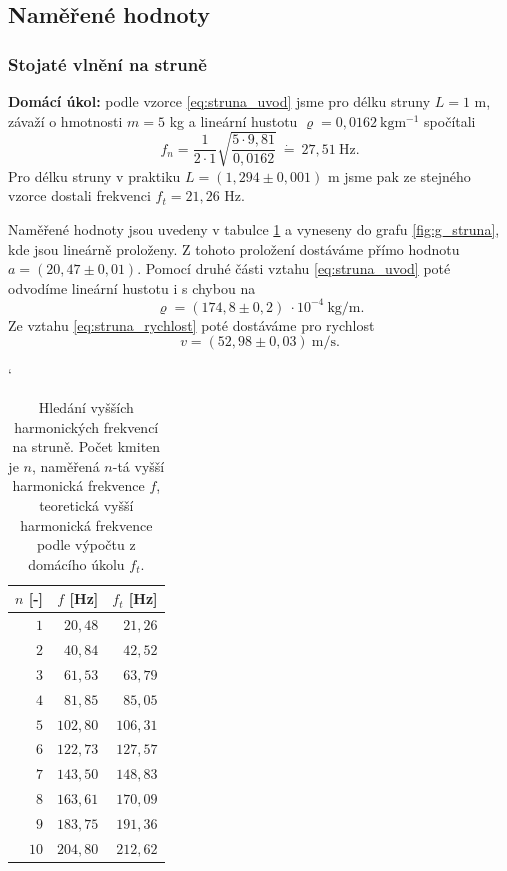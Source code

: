 \documentclass[english]{article}
\newcommand{\unit}[1]{\mathrm{#1}}
\begin{document}
\subsection{Naměřené hodnoty}
	\subsubsection{Stojaté vlnění na struně}
		\textbf{Domácí úkol:} podle vzorce \ref{eq:struna_uvod} jsme pro délku struny $L=1$ m, závaží o hmotnosti $m=5$ kg a lineární hustotu $\varrho=0,0162\ \unit{kgm^{-1}}$ spočítali
			\begin{equation}
			f_n = \frac{1}{2\cdot 1} \sqrt{\frac{5\cdot 9,81}{0,0162}}\ \dot{=}\ 27,51\ \unit{Hz}.
			\label{eq:struna_vypocet}
			\end{equation}		
		Pro délku struny v praktiku $L = (1,294 \pm 0,001)$ m jsme pak ze stejného vzorce dostali frekvenci $f_t = 21,26$ Hz.	
		 
		Naměřené hodnoty jsou uvedeny v tabulce \ref{tab:struna} a vyneseny do grafu \ref{fig:g_struna}, kde jsou lineárně proloženy. Z tohoto proložení dostáváme přímo hodnotu $a = (20,47 \pm 0,01)$. Pomocí druhé části vztahu \ref{eq:struna_uvod} poté odvodíme lineární hustotu i s chybou na
			\begin{equation}
			\varrho = (174,8 \pm 0,2)\ \cdot 10^{-4}\ \unit{kg/m}.
			\label{eq:struna_vysledky_1}
			\end{equation}
		Ze vztahu \ref{eq:struna_rychlost} poté dostáváme pro rychlost  
			\begin{equation}
			v = (52,98 \pm 0,03)\ \unit{m/s}.
			\label{eq:struna_vysledky_2}
			\end{equation}
					
		\begin{table}[h]
		\catcode` %
		\begin{center}
		\begin{tabular}{|r|r|r|}
		\hline
			$n$ [-]  &  $f$ [Hz]  &  $f_t$ [Hz]   \\\hline
		    $1$  &  $20,48$  &  $21,26$ \\\hline
		    $2$  &  $40,84$  &  $42,52$ \\\hline
		    $3$  &  $61,53$  &  $63,79$ \\\hline
		    $4$  &  $81,85$  &  $85,05$ \\\hline
		    $5$  &  $102,80$  &  $106,31$ \\\hline
		    $6$  &  $122,73$  &  $127,57$ \\\hline
		    $7$  &  $143,50$  &  $148,83$ \\\hline
		    $8$  &  $163,61$  &  $170,09$ \\\hline
		    $9$  &  $183,75$  &  $191,36$ \\\hline
		    $10$  &  $204,80$  &  $212,62$ \\\hline
		\end{tabular}
		\caption{Hledání vyšších harmonických frekvencí na struně. Počet kmiten je $n$, naměřená $n$-tá vyšší harmonická frekvence $f$, teoretická vyšší harmonická frekvence podle výpočtu z domácího úkolu $f_t$.}
		\label{tab:struna}
		\end{center}
		\end{table}
		
\end{document}
